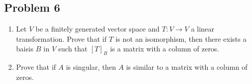 \documentclass[fleqn]{article}
\begin{document}
\subsection{Problem 6}
\label{sec-1-6}
\begin{enumerate}
\item Let $V$ be a finitely generated vector space and $T:V\to V$ a linear 
transformation.  Prove that if $T$ is not an isomorphism, then there
exists a baisis $B$ in $V$ such that $[T]_B$ is a matrix with a column of
zeros.
\item Prove that if $A$ is singular, then $A$ is similar to a matrix with a
column of zeros.
\end{enumerate}
\end{document}
